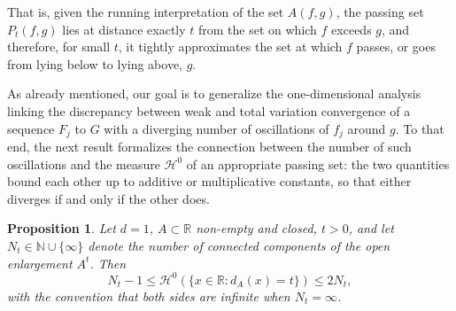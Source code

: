 \documentclass[12pt]{article}
\newtheorem{proposition}{Proposition}
\newcommand{\RR}{\mathbb{R}}
\newcommand{\NN}{\mathbb{N}}
\begin{document}
That is, given the running interpretation of the set $A(f,g)$, the passing set $P_t(f,g)$ lies at distance exactly $t$ from the set on which $f$ exceeds $g$, and
therefore, for small $t$, it tightly approximates the set at which $f$ passes, or goes from lying below to lying above, $g$.




As already mentioned, our goal is to generalize the one-dimensional analysis linking the discrepancy between weak and total variation convergence of a sequence $F_j$ to $G$ with a diverging number of oscillations of $f_j$ around $g$. To that end, the next result formalizes the connection between the number of such oscillations and the measure $\mathcal H^0$ of an appropriate passing set: the two quantities bound each other up to additive or multiplicative constants, so that either diverges if and only if the other does.

\begin{proposition}\label{prop:d1_recovery}
Let $d=1$, $A\subset\RR$ non-empty and closed, $t>0$, and let
$N_t\in\NN\cup\{\infty\}$ denote the number of connected components of the open enlargement $A^t$. Then
\begin{equation*}
N_t - 1 \leq \mathcal H^{0}(\{x\in\RR : d_A(x)=t\}) \leq 2 N_t,
\end{equation*}
with the convention that both sides are infinite when $N_t=\infty$.
\end{proposition}
\end{document}

